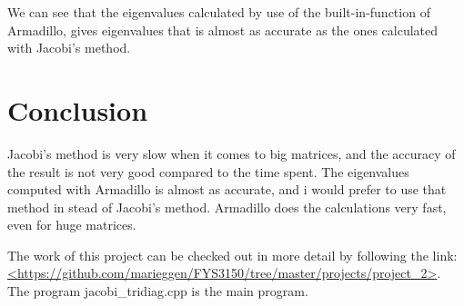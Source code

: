 \documentclass[12pt]{article}
\begin{document}
\begin{flushleft}
We can see that the eigenvalues calculated by use of the built-in-function of Armadillo, gives eigenvalues that is almost as accurate as the ones calculated with Jacobi's method.








\newpage
\section{Conclusion}
Jacobi's method is very slow when it comes to big matrices, and the accuracy of the result is not very good compared to the time spent. The eigenvalues computed with Armadillo is almost as accurate, and i would prefer to use that method in stead of Jacobi's method. Armadillo does the calculations very fast, even for huge matrices.
\vspace{5mm}

The work of this project can be checked out in more detail by following the link: \url{<https://github.com/marieggen/FYS3150/tree/master/projects/project_2>}. The program jacobi\_tridiag.cpp is the main program.









\end{flushleft}
\end{document}
